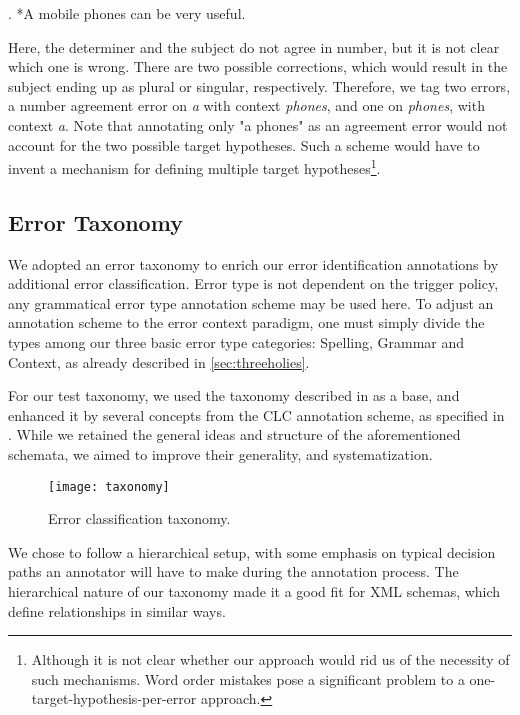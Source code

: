 \documentclass[12pt]{scrartcl}
\begin{document}
\ex. *A mobile phones can be very useful.

Here, the determiner and the subject do not agree in number, but it is not clear
which one is wrong. There are two possible corrections, which would result
in the subject ending up as plural or singular, respectively. Therefore, we tag
two errors, a number agreement error on \textit{a} with context \textit{phones}, and
one on \textit{phones}, with context \textit{a}. Note that annotating only "a
phones" as an agreement error would not account for the two possible target
hypotheses. Such a scheme would have to invent a mechanism for defining multiple
target hypotheses\footnote{Although it is not clear whether our approach would
rid us of the necessity of such mechanisms. Word order mistakes pose a
significant problem to a one-target-hypothesis-per-error approach.}.


\subsection{Error Taxonomy}
We adopted an error taxonomy to enrich our error identification annotations by
additional error classification. Error type is not dependent on the trigger
policy, any grammatical error type annotation scheme may be used here. To adjust
an annotation scheme to the error context paradigm, one must simply divide the
types among our three basic error type categories: Spelling, Grammar and
Context, as already described in \ref{sec:threeholies}.

For our test taxonomy, we used the taxonomy described in \cite{negrillo} as a
base, and enhanced it by several concepts from the CLC annotation scheme, as
specified in \cite{CLC}. While we retained the general ideas and structure of
the aforementioned schemata, we aimed to improve their generality, and
systematization.

\begin{figure}
\centering
\texttt{[image: taxonomy]}
\caption{Error classification taxonomy.}
\end{figure}

We chose to follow a hierarchical setup, with some emphasis on typical decision
paths an annotator will have to make during the annotation process. The
hierarchical nature of our taxonomy made it a good fit for XML schemas, which
define relationships in similar ways.
\end{document}
